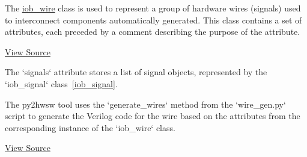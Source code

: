 %

%
%

The \href{https://github.com/IObundle/py2hwsw/blob/main/py2hwsw/scripts/iob_wire.py}{iob\_wire} class is used to represent a group of hardware wires (signals) used to interconnect components automatically generated.
This class contains a set of attributes, each preceded by a comment describing the purpose of the attribute.


\href{https://github.com/IObundle/py2hwsw/blob/main/py2hwsw/scripts/iob_wire.py}{View Source}

The `signals` attribute stores a list of signal objects, represented by the `iob\_signal` class~\ref{iob_signal}.

%
%

The py2hwsw tool uses the `generate\_wires` method from the `wire\_gen.py` script to generate the Verilog code for the wire based on the attributes from the corresponding instance of the `iob\_wire` class.


\href{https://github.com/IObundle/py2hwsw/blob/main/py2hwsw/scripts/wire_gen.py}{View Source}
